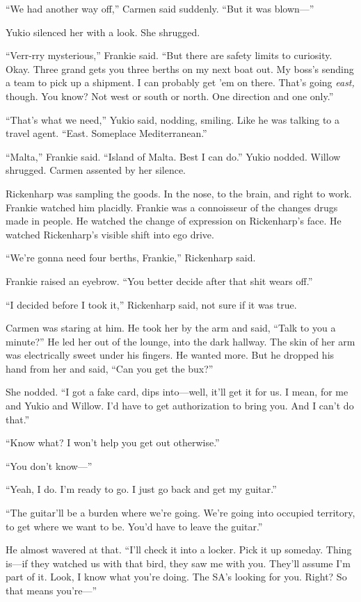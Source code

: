 ``We had another way off,'' Carmen said suddenly. ``But it was blown---''

Yukio silenced her with a look. She shrugged.

``Verr-rry mysterious,'' Frankie said. ``But there are safety limits to curiosity. Okay. Three grand gets you three berths on my next boat out. My boss's sending a team to pick up a shipment. I can probably get 'em on there. That's going \textit{east,} though. You know? Not west or south or north. One direction and one only.''

``That's what we need,'' Yukio said, nodding, smiling. Like he was talking to a travel agent. ``East. Someplace Mediterranean.''

``Malta,'' Frankie said. ``Island of Malta. Best I can do.'' Yukio nodded. Willow shrugged. Carmen assented by her silence.

Rickenharp was sampling the goods. In the nose, to the brain, and right to work. Frankie watched him placidly. Frankie was a connoisseur of the changes drugs made in people. He watched the change of expression on Rickenharp's face. He watched Rickenharp's visible shift into ego drive.

``We're gonna need four berths, Frankie,'' Rickenharp said.

Frankie raised an eyebrow. ``You better decide after that shit wears off.''

``I decided before I took it,'' Rickenharp said, not sure if it was true.

Carmen was staring at him. He took her by the arm and said, ``Talk to you a minute?'' He led her out of the lounge, into the dark hallway. The skin of her arm was electrically sweet under his fingers. He wanted more. But he dropped his hand from her and said, ``Can you get the bux?''

She nodded. ``I got a fake card, dips into---well, it'll get it for us. I mean, for me and Yukio and Willow. I'd have to get authorization to bring you. And I can't do that.''

``Know what? I won't help you get out otherwise.''

``You don't know---''

``Yeah, I do. I'm ready to go. I just go back and get my guitar.''

``The guitar'll be a burden where we're going. We're going into occupied territory, to get where we want to be. You'd have to leave the guitar.''

He almost wavered at that. ``I'll check it into a locker. Pick it up someday. Thing is---if they watched us with that bird, they saw me with you. They'll assume I'm part of it. Look, I know what you're doing. The SA's looking for you. Right? So that means you're---''

